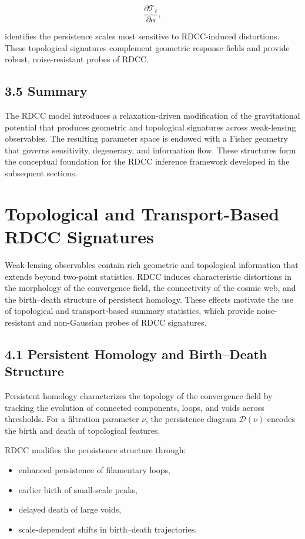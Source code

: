 \documentclass[11pt,a4paper]{article}
\begin{document}
\[
    \frac{\partial \mathcal{T}_{\ell}}{\partial \alpha},
\]


identifies the persistence scales most sensitive to RDCC-induced distortions. 
These topological signatures complement geometric response fields and provide 
robust, noise-resistant probes of RDCC.

\subsection*{3.5 Summary}

The RDCC model introduces a relaxation-driven modification of the gravitational 
potential that produces geometric and topological signatures across weak-lensing 
observables. The resulting parameter space is endowed with a Fisher geometry 
that governs sensitivity, degeneracy, and information flow. These structures 
form the conceptual foundation for the RDCC inference framework developed in the 
subsequent sections.
\section{Topological and Transport-Based RDCC Signatures}

Weak-lensing observables contain rich geometric and topological information that 
extends beyond two-point statistics. RDCC induces characteristic distortions in 
the morphology of the convergence field, the connectivity of the cosmic web, and 
the birth--death structure of persistent homology. These effects motivate the 
use of topological and transport-based summary statistics, which provide 
noise-resistant and non-Gaussian probes of RDCC signatures.

\subsection*{4.1 Persistent Homology and Birth--Death Structure}

Persistent homology characterizes the topology of the convergence field by 
tracking the evolution of connected components, loops, and voids across 
thresholds. For a filtration parameter $\nu$, the persistence diagram 
$\mathcal{D}(\nu)$ encodes the birth and death of topological features.

RDCC modifies the persistence structure through:

\begin{itemize}
    \item enhanced persistence of filamentary loops,
    \item earlier birth of small-scale peaks,
    \item delayed death of large voids,
    \item scale-dependent shifts in birth--death trajectories.
\end{itemize}
\end{document}
